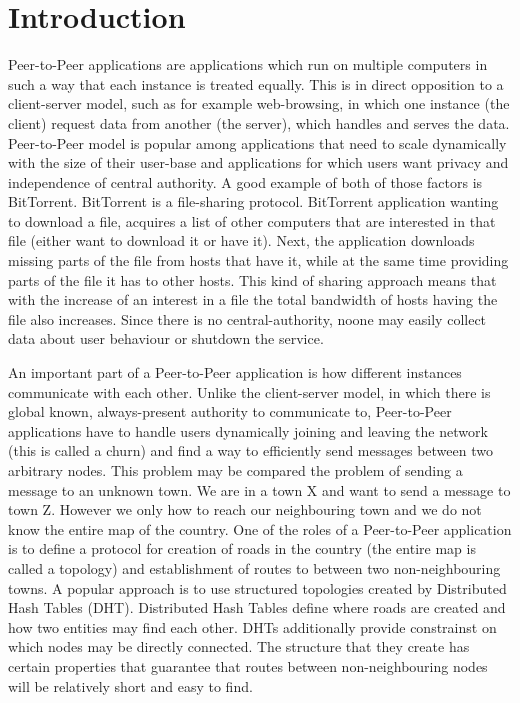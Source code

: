 \chapter{Introduction}

Peer-to-Peer applications are applications which run on multiple computers in
such a way that each instance is treated equally.
This is in direct opposition to a client-server model, such as for example
web-browsing, in which one instance (the client) request data from another (the
server), which handles and serves the data.
Peer-to-Peer model is popular among applications that need to scale dynamically
with the size of their user-base and applications for which users want privacy
and independence of central authority.
A good example of both of those factors is BitTorrent.
BitTorrent is a file-sharing protocol.
BitTorrent application wanting to download a file, acquires a list of other
computers that are interested in that file (either want to download it or have
it).
Next, the application downloads missing parts of the file from hosts that have
it, while at the same time providing parts of the file it has to other hosts.
This kind of sharing approach means that with the increase of an interest in a
file the total bandwidth of hosts having the file also increases.
Since there is no central-authority, noone may easily collect data about user
behaviour or shutdown the service.

An important part of a Peer-to-Peer application is how different instances
communicate with each other.
Unlike the client-server model, in which there is global known, always-present
authority to communicate to, Peer-to-Peer applications have to handle users
dynamically joining and leaving the network (this is called a churn) and find
a way to efficiently send messages between two arbitrary nodes.
This problem may be compared the problem of sending a message to an unknown
town.
We are in a town X and want to send a message to town Z.
However we only how to reach our neighbouring town and we do not know the entire
map of the country.
One of the roles of a Peer-to-Peer application is to define a protocol for
creation of roads in the country (the entire map is called a topology) and
establishment of routes to between two non-neighbouring towns.
A popular approach is to use structured topologies created by Distributed Hash
Tables (DHT). 
Distributed Hash Tables define where roads are created and how two entities may
find each other.
DHTs additionally provide constrainst on which nodes may be directly connected.
The structure that they create has certain properties that guarantee that routes
between non-neighbouring nodes will be relatively short and easy to find.

